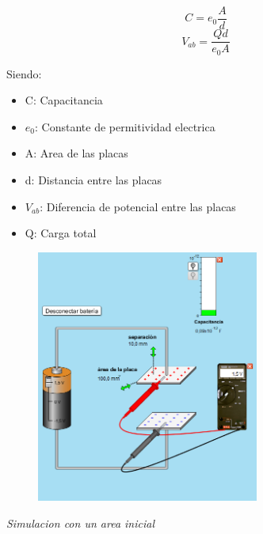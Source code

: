 \documentclass[12pt]{report}
\begin{document}
\begin{enumerate}
    \begin{center}
    \[C=e_0\frac{A}{d}\]
    \[V_{ab}=\frac{Qd}{e_0A}\]

    \end{center}
    
    Siendo:\\
    \begin{itemize}
        \item C: Capacitancia
        \item $e_0$: Constante de permitividad electrica
        \item A: Area de las placas
        \item d: Distancia entre las placas
        \item $V_{ab}$: Diferencia de potencial entre las placas
        \item Q: Carga total
        \end{itemize}


\begin{figure}[h]
    \centering
    \includegraphics[width=0.65\textwidth]{./images/1FOTO3.png}
\end{figure}
    \textit{Simulacion con un area inicial}
    
         \vspace{13cm}



\end{enumerate}
\end{document}
